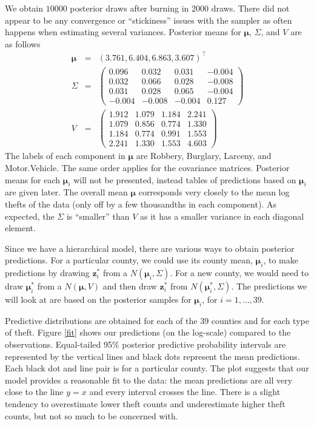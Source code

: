 \documentclass{asaproc}
\newcommand{\m}[1]{\mathbf{\bm{#1}}}
\begin{document}
We obtain $10000$ posterior draws after burning in $2000$ draws. There did not appear to be any convergence or ``stickiness'' issues with the sampler as often happens when estimating several variances. Posterior means for $\m{\mu}$, $\Sigma$, and $V$ are as follows
\begin{eqnarray*}
\m{\mu}&=&(3.761, 6.404, 6.863, 3.607)^\top \\
\Sigma&=&\left(\begin{array}{rrrr}
 0.096 &  0.032 &  0.031 & -0.004 \\
 0.032 &  0.066 &  0.028 & -0.008 \\
 0.031 &  0.028 &  0.065 & -0.004 \\
-0.004 & -0.008 & -0.004 &  0.127
\end{array}\right)  \\
V&=&\left(\begin{array}{rrrr}
1.912 & 1.079 & 1.184 & 2.241 \\
1.079 & 0.856 & 0.774 & 1.330 \\
1.184 & 0.774 & 0.991 & 1.553 \\
2.241 & 1.330 & 1.553 & 4.603
\end{array}\right)
\end{eqnarray*}
The labels of each component in $\m{\mu}$ are Robbery, Burglary, Larceny, and Motor.Vehicle. The same order applies for the covariance matrices. Posterior means for each $\m{\mu}_i$ will not be presented, instead tables of predictions based on $\m{\mu}_i$ are given later. The overall mean $\m{\mu}$ corresponds very closely to the mean log thefts of the data (only off by a few thousandths in each component). As expected, the $\Sigma$ is ``smaller'' than $V$ as it has a smaller variance in each diagonal element.

Since we have a hierarchical model, there are various ways to obtain posterior predictions. For a particular county, we could use its county mean, $\m{\mu}_i$, to make predictions by drawing $\m{z}_i^*$ from a $N(\m{\mu}_i,\Sigma)$. For a new county, we would need to draw $\m{\mu}_i^*$ from a $N(\m{\mu}, V)$ and then draw $\m{z}_i^*$ from $N(\m{\mu}_i^*,\Sigma)$. The predictions we will look at are based on the posterior samples for $\m{\mu}_i$, for $i=1,\ldots,39$.

Predictive distributions are obtained for each of the 39 counties and for each type of theft. Figure \ref{fit} shows our predictions (on the log-scale) compared to the observations. Equal-tailed 95\% posterior predictive probability intervals are represented by the vertical lines and black dots represent the mean predictions. Each black dot and line pair is for a particular county. The plot suggests that our model provides a reasonable fit to the data: the mean predictions are all very close to the line $y=x$ and every interval crosses the line. There is a slight tendency to overestimate lower theft counts and underestimate higher theft counts, but not so much to be concerned with.
\end{document}
